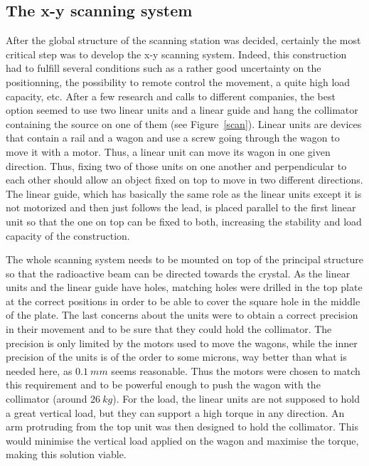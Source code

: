 \documentclass[11pt,a4paper]{article}
\begin{document}
\subsection{The x-y scanning system}

After the global structure of the scanning station was decided, certainly the most critical step was to develop the x-y scanning system. Indeed, this construction had to fulfill several conditions such as a rather good uncertainty on the positionning, the possibility to remote control the movement, a quite high load capacity, etc. After a few research and calls to different companies, the best option seemed to use two linear units and a linear guide and hang the collimator containing the source on one of them (see Figure~\ref{scan}). Linear units are devices that contain a rail and a wagon and use a screw going through the wagon to move it with a motor. Thus, a linear unit can move its wagon in one given direction. Thus, fixing two of those units on one another and perpendicular to each other should allow an object fixed on top to move in two different directions. The linear guide, which has basically the same role as the linear units except it is not motorized and then just follows the lead, is placed parallel to the first linear unit so that the one on top can be fixed to both, increasing the stability and load capacity of the construction.

The whole scanning system needs to be mounted on top of the principal structure so that the radioactive beam can be directed towards the crystal. As the linear units and the linear guide have holes, matching holes were drilled in the top plate at the correct positions in order to be able to cover the square hole in the middle of the plate. The last concerns about the units were to obtain a correct precision in their movement and to be sure that they could hold the collimator. The precision is only limited by the motors used to move the wagons, while the inner precision of the units is of the order to some microns, way better than what is needed here, as $0.1~mm$ seems reasonable. Thus the motors were chosen to match this requirement and to be powerful enough to push the wagon with the collimator (around $26~kg$). For the load, the linear units are not supposed to hold a great vertical load, but they can support a high torque in any direction. An arm protruding from the top unit was then designed to hold the collimator. This would minimise the vertical load applied on the wagon and maximise the torque, making this solution viable.
\end{document}
